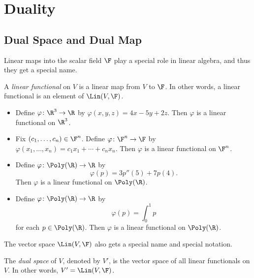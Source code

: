 \iftestbuild %
\setcounter{section}{5}\setcounter{theorem}{107}
\fi %
\section{Duality}

\subsection{Dual Space and Dual Map}

Linear maps into the scalar field $\F$ play a special role in linear algebra, and
thus they get a special name.

\begin{definition}\label{ax:3.108}
A \emph{linear functional} on $V$ is a linear map from $V$ to $\F$. In other
words, a linear functional is an element of $\Lin(V,\F)$.
\end{definition}

\begin{example}\label{ax:3.109}\leavevmode
\begin{itemize}
\item Define $\varphi\colon\R^3\to\R$ by $\varphi(x,y,z)=4x-5y+2z$. Then
  $\varphi$ is a linear functional on $\R^3$.
\item Fix $(c_1,\dots,c_n)\in\F^n$. Define $\varphi\colon\F^n\to\F$ by
  $\varphi(x_1,\dots,x_n)=c_1x_1+\cdots+c_nx_n$. Then $\varphi$ is a linear
  functional on $\F^n$.
\item Define $\varphi\colon\Poly(\R)\to\R$ by
  \[ \varphi(p) = 3p''(5)+7p(4). \]
  Then $\varphi$ is a linear functional on $\Poly(\R)$.
\item Define $\varphi\colon\Poly(\R)\to\R$ by
  \[ \varphi(p) = \int_0^1 p \]
  for each $p\in\Poly(\R)$. Then $\varphi$ is a linear functional on
  $\Poly(\R)$.
\end{itemize}
\end{example}

The vector space $\Lin(V,\F)$ also gets a special name and special notation.

\begin{definition}\label{ax:3.110}
The \emph{dual space} of $V$, denoted by $V'$, is the vector space of all linear
functionals on $V$. In other words, $V'=\Lin(V,\F)$.
\end{definition}

